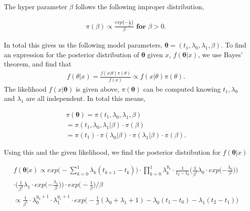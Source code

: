 The hyper parameter $\beta$ follows the following improper distribution,

\begin{align}
    \pi (\beta) \propto \frac{exp\{ -\frac{1}{\beta} \} }{\beta} \textbf{ for } \beta > 0.
\end{align}

In total this gives us the following model parameters, $\boldsymbol{\theta} = (t_1, \lambda_0, \lambda_1, \beta)$. 
To find an expression for the posterior distribution of $\boldsymbol{\theta}$ given $x$, $f(\boldsymbol{\theta}|x)$, we use Bayes' theorem, and find that 
\begin{align}
    f(\theta|x) = \frac{f(x|\theta) \pi(\theta)}{f(x)} \propto f(x|\theta) \pi(\theta) .
\end{align}
The likelihood $f(x | \boldsymbol{\theta})$ is given above, $\pi(\boldsymbol{\theta})$ can be computed knowing $t_1, \lambda_0$ and $\lambda_1$ are all independent. In total this means,

\begin{align}
    \pi(\boldsymbol{\theta}) 
    = \pi(t_1, \lambda_0, \lambda_1, \beta) \nonumber \\
    = \pi(t_1, \lambda_0, \lambda_1 | \beta) \cdot \pi(\beta) \nonumber \\
    = \pi(t_1) \cdot \pi(\lambda_0|\beta) \cdot \pi(\lambda_1|\beta) \cdot \pi(\beta).
\end{align}

Using this and the given likelihood, we find the posterior distribution for $f(\boldsymbol{\theta}|x)$

\begin{align} \label{eq:post}
    f(\boldsymbol{\theta}|x) \propto exp \Big( - \sum_{k = 0}^1 \lambda_k (t_{k+1} - t_k) \Big)\cdot \prod_{k = 0}^1 \lambda_k^{y_k} \cdot \frac{1}{t_2-t_0} 
    \Big( \frac{1}{\beta^2} \lambda_0 \cdot
    exp \Big({-\frac{\lambda_0}{\beta}} \Big)  \Big) \nonumber \\ 
    \cdot \Big( \frac{1}{\beta^2} \lambda_1 \cdot exp \Big({-\frac{\lambda_1}{\beta}} \Big) \Big) \cdot exp \Big( -\frac{1}{\beta} \Big)/\beta \nonumber \\
    \propto   \frac{1}{\beta^5} \cdot \lambda_0^{y_0 + 1} \cdot \lambda_1^{y_1 + 1} \cdot exp \Big( -\frac{1}{\beta}(\lambda_0 + \lambda_1 + 1) - \lambda_0(t_1-t_0) - \lambda_1(t_2-t_1) \Big)
\end{align}




